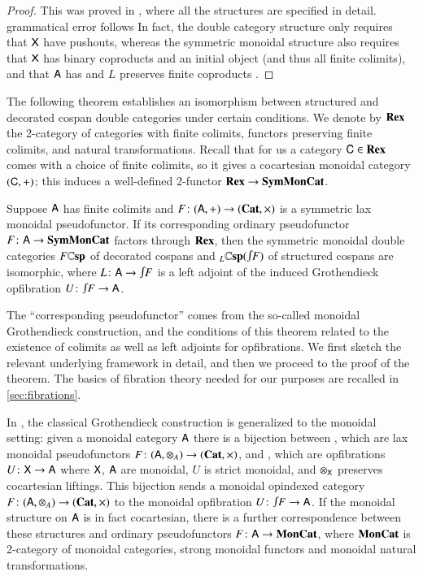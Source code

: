 \documentclass[reqno]{amsart}
\begin{document}
\begin{proof}
This was proved in \cite[Theorems~2.3 \& 3.9]{BC}, where all the structures are specified in detail. {\chris grammatical error follows} In fact, the double category structure only requires that $\mathsf{X}$ have pushouts, whereas the symmetric monoidal structure also requires that $\mathsf{X}$ has binary coproducts and an initial object (and thus all finite colimits), and that $\mathsf{A}$ has and $L$ preserves finite coproducts \cite[Theorem~3.2.3]{CourserThesis}.
\end{proof}

The following theorem establishes an isomorphism between structured and decorated cospan double categories under certain conditions.  We denote by $\mathbf{Rex}$ the 2-category of categories with finite colimits, functors preserving finite colimits, and natural transformations.   Recall that for us a category $\mathsf{C} \in \mathbf{Rex}$ comes with a choice of finite colimits, so it gives a cocartesian monoidal category $(\mathsf{C},+)$; this induces a well-defined 2-functor $\mathbf{Rex}\to\mathbf{SymMonCat}$.

\begin{thm} \label{thm:equiv}
Suppose $\mathsf{A}$ has finite colimits and $F \colon (\mathsf{A},+) \to (\mathbf{Cat},\times)$ is a symmetric lax monoidal pseudofunctor. If its corresponding ordinary pseudofunctor %
$F\colon \mathsf{A}\to\mathbf{SymMonCat}$ factors through $\mathbf{Rex}$, then the symmetric monoidal double categories $F\mathbf{\mathbb Csp}$ of decorated cospans and $_L\lCsp(\inta F)$ of structured cospans are isomorphic, where $L \maps \A \to \inta F$ is a left adjoint of the induced Grothendieck opfibration $U\maps \inta F \to \A$.
\end{thm}

The ``corresponding pseudofunctor'' comes from the so-called monoidal Grothendieck construction, and the conditions of this theorem related to the existence of colimits as well as left adjoints for opfibrations. We first sketch the relevant underlying framework in detail, and then we proceed to the proof of the theorem. The basics of fibration theory needed for our purposes are recalled in \cref{sec:fibrations}. 

In \cite{MV}, the classical Grothendieck construction is generalized to the monoidal setting: given a monoidal category $\mathsf{A}$ there is a bijection between , which are lax monoidal pseudofunctors $F\colon (\mathsf{A}, \otimes_A) \to (\mathbf{Cat}, \times)$, and , which are opfibrations $U \colon \mathsf{X} \to \mathsf{A}$ where $\mathsf{X}$, $\mathsf{A}$ are monoidal, $U$ is strict monoidal,
and $\otimes_{\mathsf{X}}$ preserves cocartesian liftings.   This bijection sends a monoidal opindexed category $F \colon (\mathsf{A},\otimes_A) \to (\mathbf{Cat}, \times)$ to the monoidal opfibration $U \maps \inta F \to \A$.  If the monoidal structure on $\mathsf{A}$ is in fact cocartesian, there is a further correspondence between these structures and ordinary pseudofunctors $F\colon \mathsf{A} \to \mathbf{MonCat}$, where $\mathbf{MonCat}$ is 2-category of monoidal categories, strong monoidal functors and monoidal natural transformations.
\end{document}
